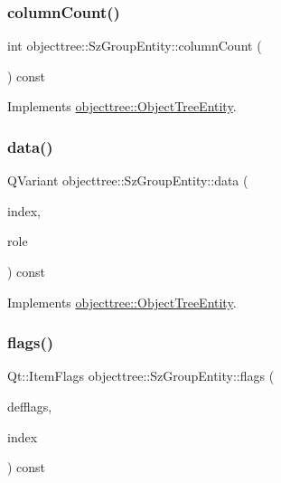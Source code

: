 \subsubsection{\texorpdfstring{columnCount()}{columnCount()}}
{\footnotesize\ttfamily int objecttree\+::\+Sz\+Group\+Entity\+::column\+Count (\begin{DoxyParamCaption}{ }\end{DoxyParamCaption}) const\hspace{0.3cm}{\ttfamily [virtual]}}



Implements \mbox{\hyperlink{classobjecttree_1_1_object_tree_entity_a70fd25eccf88b305e9db15fbe3daeae8}{objecttree\+::\+Object\+Tree\+Entity}}.

\mbox{\label{classobjecttree_1_1_sz_group_entity_acc2ac6ed31f26c3948efbd6066a0933a}} 
\subsubsection{\texorpdfstring{data()}{data()}}
{\footnotesize\ttfamily Q\+Variant objecttree\+::\+Sz\+Group\+Entity\+::data (\begin{DoxyParamCaption}\item[{const Q\+Model\+Index \&}]{index,  }\item[{int}]{role }\end{DoxyParamCaption}) const\hspace{0.3cm}{\ttfamily [virtual]}}



Implements \mbox{\hyperlink{classobjecttree_1_1_object_tree_entity_a2413c6573de18b451d97eb3800f10f35}{objecttree\+::\+Object\+Tree\+Entity}}.

\mbox{\label{classobjecttree_1_1_sz_group_entity_a054fe370e7cb70ac63fe10d6a1d936be}} 
\subsubsection{\texorpdfstring{flags()}{flags()}}
{\footnotesize\ttfamily Qt\+::\+Item\+Flags objecttree\+::\+Sz\+Group\+Entity\+::flags (\begin{DoxyParamCaption}\item[{Qt\+::\+Item\+Flags}]{defflags,  }\item[{const Q\+Model\+Index \&}]{index }\end{DoxyParamCaption}) const\hspace{0.3cm}{\ttfamily [virtual]}}



